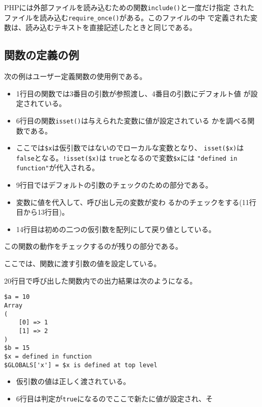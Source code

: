 PHPには外部ファイルを読み込むための関数\texttt{include()}と一度だけ指定
されたファイルを読み込む\texttt{require\_once()}がある。このファイルの中
で定義された変数は、読み込むテキストを直接記述したときと同じである。
\subsection{関数の定義の例}
\begin{Exec}\upshape
 次の例はユーザー定義関数の使用例である。
\begin{itemize}
 \item 1行目の関数では3番目の引数が参照渡し、4番目の引数にデフォルト値
       が設定されている。 
 \item 6行目の関数\texttt{isset()}は与えられた変数に値が設定されている
       かを調べる関数である。
 \item ここでは\Verb+$x+は仮引数ではないのでローカルな変数となり、
       \Verb+isset($x)+は\texttt{false}となる。\Verb+!isset($x)+は
       \texttt{true}となるので変数\Verb+$x+には
       \Verb+"defined in function"+が代入される。
 \item 9行目ではデフォルトの引数のチェックのための部分である。
 \item 変数に値を代入して、呼び出し元の変数が変わ
       るかのチェックをする(11行目から13行目)。
 \item 14行目は初めの二つの仮引数を配列にして戻り値としている。
\end{itemize}
この関数の動作をチェックするのが残りの部分である。
 \iffalse
 \begin{listingcont}
$a = 10;
$as = array(1,2);
$b = 15;
$x = "\$x is defined at top level";
 \end{listingcont}
 \fi
 ここでは、関数に渡す引数の値を設定している。
 \iffalse
 \begin{listingcont}
example($a, $as, $b, true);
print "\$a = $a\n";
print_r($as);  
print "\$b = $b\n";
 \end{listingcont}
\fi
20行目で呼び出した関数内での出力結果は次のようになる。
\begin{Verbatim}
$a = 10
Array
(
    [0] => 1
    [1] => 2
)
$b = 15
$x = defined in function
$GLOBALS['x'] = $x is defined at top level
\end{Verbatim}
\begin{itemize}
 \item 仮引数の値は正しく渡されている。
 \item 6行目は判定が\texttt{true}になるのでここで新たに値が設定され、そ

\end{itemize}
\end{Exec}
